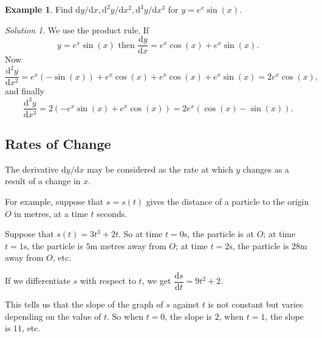 \documentclass[
  english,
  11pt,
  oneside]{book}
\newcommand{\slide}{}
\theoremstyle{definition}
\theoremstyle{definition}
\newtheorem{example}{Example}[chapter]
\theoremstyle{definition}
\theoremstyle{definition}
\theoremstyle{remark}
\newtheorem*{solution}{Solution}
\begin{document}
\begin{example}
Find \(\mathrm{d}y/\mathrm{d} x, \mathrm{d}^{2}y/\mathrm{d} x^2, \mathrm{d}^{3}y/\mathrm{d} x^{3}\) for \(y =e^x\sin(x)\).
\end{example}

\begin{solution}
We use the product rule. If
\[
y=e^x\sin(x)\text{ then }\frac{\mathrm{d} y}{\mathrm{d} x} = e^x\cos(x) + e^x\sin(x).
\]
Now
\[
\frac{\mathrm{d}^{2}y}{\mathrm{d} x^2} = e^x(-\sin(x)) + e^x\cos(x) + e^x\cos(x)+e^x\sin(x) = 2e^x\cos(x),
\]
and finally
\[
\frac{\mathrm{d}^{3}y}{\mathrm{d} x^{3}} = 2(-e^x\sin(x)+e^x\cos(x)) = 2e^x(\cos(x)-\sin(x)).
\]
\end{solution}

\slide

\subsection{Rates of Change}\label{rates-of-change}

\begin{notslides}

The derivative \(\mathrm{d}y/\mathrm{d} x\) may be considered as the rate at which \(y\) changes as a result of a change in \(x\).

For example, suppose that \(s=s(t)\) gives the distance of a particle to the origin \(O\) in metres, at a time \(t\) seconds.

Suppose that \(s(t) = 3t^3 + 2t\). So at time \(t = 0\text{s}\), the particle is at \(O\); at time \(t = 1\text{s}\), the particle is \(5\text{m}\) metres away from \(O\); at time \(t = 2\text{s}\), the particle is \(28\text{m}\) away from \(O\), etc.

If we differentiate \(s\) with respect to \(t\), we get \(\dfrac{\mathrm{d} s}{\mathrm{d} t} = 9t^2 + 2\).

This tells us that the slope of the graph of \(s\) against \(t\) is not constant but varies depending on the value of \(t\). So when \(t = 0\), the slope is \(2\), when \(t = 1\), the slope is \(11\), etc.

\end{notslides}
\end{document}
